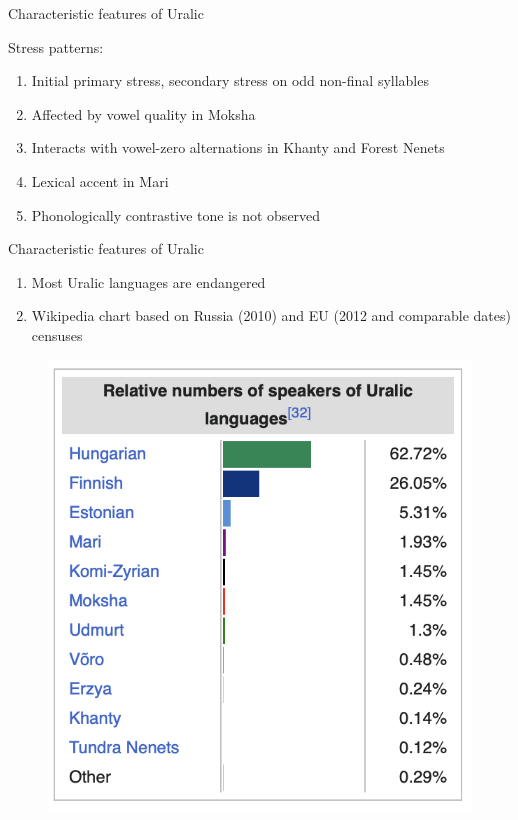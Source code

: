 \documentclass[10 pt, handout]{beamer}
\begin{document}
\begin{frame}{Characteristic features of Uralic}

	Stress patterns:
	
	\begin{enumerate}[$\gg$]
		\item Initial primary stress, secondary stress on odd non-final syllables
		\item Affected by vowel quality in Moksha
		\item Interacts with vowel-zero alternations in Khanty and Forest Nenets
		\item Lexical accent in Mari
		\item Phonologically contrastive tone is not observed
	\end{enumerate}

\end{frame}

\begin{frame}{Characteristic features of Uralic}

	\begin{enumerate}[$\gg$]
		\item Most Uralic languages are endangered
		\item Wikipedia chart based on Russia (2010) and EU (2012 and comparable dates) censuses
	\end{enumerate}
	
	\begin{figure}[H]
		\centering
		\includegraphics[scale=.5]{wiki-chart}
	\end{figure}

\end{frame}
\end{document}
